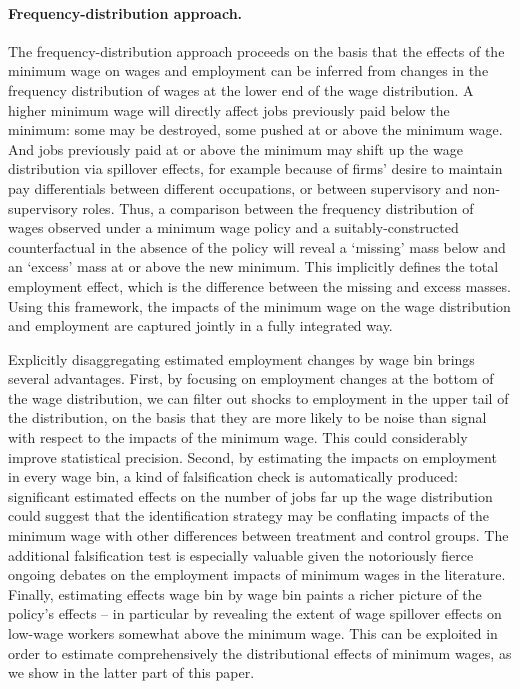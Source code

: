 \paragraph{Frequency-distribution approach.} The frequency-distribution approach proceeds on the basis that the effects of the minimum wage on wages and employment can be inferred from changes in the frequency distribution of wages at the lower end of the wage distribution. A higher minimum wage will directly affect jobs previously paid below the minimum: some may be destroyed, some pushed at or above the minimum wage. And jobs previously paid at or above the minimum may shift up the wage distribution via spillover effects, for example because of firms' desire to maintain pay differentials between different occupations, or between supervisory and non-supervisory roles. Thus, a comparison between the frequency distribution of wages observed under a minimum wage policy and a suitably-constructed counterfactual in the absence of the policy will reveal a `missing' mass below and an `excess' mass at or above the new minimum. This implicitly defines the total employment effect, which is the difference between the missing and excess masses. Using this framework, the impacts of the minimum wage on the wage distribution and employment are captured jointly in a fully integrated way. \par 

Explicitly disaggregating estimated employment changes by wage bin brings several advantages. First, by focusing on employment changes at the bottom of the wage distribution, we can filter out shocks to employment in the upper tail of the distribution, on the basis that they are more likely to be noise than signal with respect to the impacts of the minimum wage. This could considerably improve statistical precision. Second, by estimating the impacts on employment in every wage bin, a kind of falsification check is automatically produced: significant estimated effects on the number of jobs far up the wage distribution could suggest that the identification strategy may be conflating impacts of the minimum wage with other differences between treatment and control groups. The additional falsification test is especially valuable given the notoriously fierce ongoing debates on the employment impacts of minimum wages in the literature. Finally, estimating effects wage bin by wage bin paints a richer picture of the policy's effects -- in particular by revealing the extent of wage spillover effects on low-wage workers somewhat above the minimum wage. This can be exploited in order to estimate comprehensively the distributional effects of minimum wages, as we show in the latter part of this paper.\par

